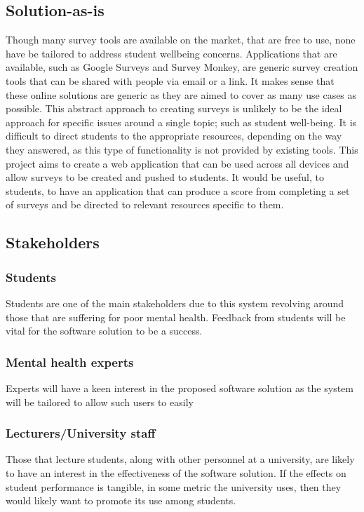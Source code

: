 \subsection{Solution-as-is}
Though many survey tools are available on the market, that are free to use, none have be tailored to address student wellbeing concerns.
Applications that are available, such as Google Surveys and Survey Monkey, are generic survey creation tools that can be shared with 
people via email or a link.
It makes sense that these online solutions are generic as they are aimed to cover as many use cases as possible.
This abstract approach to creating surveys is unlikely to be the ideal approach for specific issues around a single topic; such as
student well-being.
It is difficult to direct students to the appropriate resources, depending on the way they answered, as this type of functionality is not
provided by existing tools.
This project aims to create a web application that can be used across all devices and allow surveys to be created and pushed to students.
It would be useful, to students, to have an application that can produce a score from completing a set of surveys and be directed to relevant
resources specific to them.

\subsection{Stakeholders}

\subsubsection*{Students}
Students are one of the main stakeholders due to this system revolving around those that are suffering for poor mental health.
Feedback from students will be vital for the software solution to be a success.

\subsubsection*{Mental health experts}
Experts will have a keen interest in the proposed software solution as the system will be tailored to allow such users to easily

\subsubsection*{Lecturers/University staff}
Those that lecture students, along with other personnel at a university, are likely to have an interest in the effectiveness of the software solution.
If the effects on student performance is tangible, in some metric the university uses, then they would likely want to promote its use among students.

